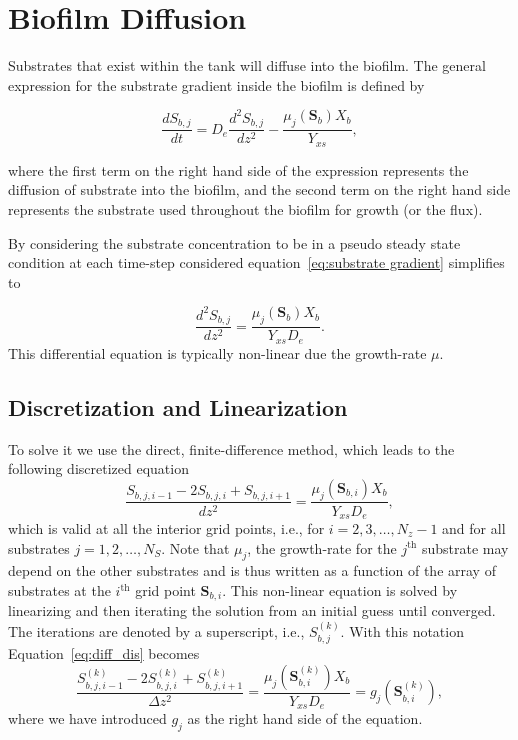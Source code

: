 \documentclass[letterpaper, twoside]{article}
\numberwithin{equation}{section}
\newcommand{\ie}{i.e.}
\begin{document}
\section{Biofilm Diffusion}
Substrates that exist within the tank will diffuse into the biofilm. The general expression for the substrate gradient inside the biofilm is defined by

\begin{equation} \label{eq:substrate gradient}
\frac{dS_{b,j}}{dt} = {D_e}\frac{d^2S_{b,j}}{dz^2} - \frac{\mu_j(\mathbf{S}_b) X_b}{Y_{xs}},
\end{equation}

where the first term on the right hand side of the expression represents the diffusion of substrate into the biofilm, and the second term on the right hand side represents the substrate used throughout the biofilm for growth (or the flux).

By considering the substrate concentration to be in a pseudo steady state condition at each time-step considered equation~\ref {eq:substrate gradient} simplifies to 

\begin{equation} \label{eq:diffusion}
  \frac{d^2 S_{b,j}}{dz^2} = \frac{\mu_j(\mathbf{S}_b) X_b}{Y_{xs} D_e}.
\end{equation}
This differential equation is typically non-linear due the growth-rate $\mu$.

\subsection{Discretization and Linearization}
To solve it we use the direct, finite-difference method, which leads to the following discretized equation
\begin{equation} \label{eq:diff_dis}
  \frac{ S_{b,j,i-1} - 2 S_{b,j,i} + S_{b,j,i+1}}{dz^2} = \frac{\mu_j(\mathbf{S}_{b,i}) X_b}{Y_{xs} D_e},
\end{equation}
which is valid at all the interior grid points, \ie, for $i=2,3,\dots,N_z-1$ and for all substrates $j=1,2,\dots,N_S$.
Note that $\mu_j$, the growth-rate for the $j^\mathrm{th}$ substrate may depend on the other substrates and is thus written as a function of the array of substrates at the $i^\mathrm{th}$ grid point $\mathbf{S}_{b,i}$.
This non-linear equation is solved by linearizing and then iterating the solution from an initial guess until converged.
The iterations are denoted by a superscript, \ie, $S_{b,j}^{(k)}$.  With this notation Equation~\ref{eq:diff_dis} becomes
\begin{equation} \label{eq:diff_dis_iter}
  \frac{ S_{b,j,i-1}^{(k)} - 2 S_{b,j,i}^{(k)} + S_{b,j,i+1}^{(k)}}{\Delta z^2} = \frac{\mu_j\left(\mathbf{S}_{b,i}^{(k)}\right) X_b}{Y_{xs} D_e} =  g_j\left(\mathbf{S}_{b,i}^{(k)}\right),
\end{equation}
where we have introduced $g_j$ as the right hand side of the equation.
\end{document}
